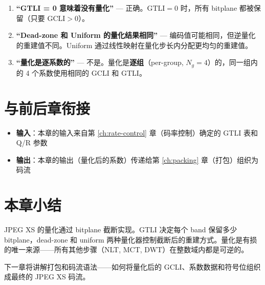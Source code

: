 \begin{misunderstanding}
\begin{enumerate}
  \item \textbf{``GTLI = 0 意味着没有量化''} --- 正确。$\mathrm{GTLI} = 0$ 时，所有 bitplane 都被保留（只要 $\mathrm{GCLI} > 0$）。
  \item \textbf{``Dead-zone 和 Uniform 的量化结果相同''} --- 编码值可能相同，但逆量化的重建值不同。Uniform 通过线性映射在量化步长内分配更均匀的重建值。
  \item \textbf{``量化是逐系数的''} --- 不是。量化是\textbf{逐组}（per-group, $N_g = 4$）的，同一组内的 4 个系数使用相同的 GCLI 和 GTLI。
\end{enumerate}
\end{misunderstanding}

\section{与前后章衔接}

\begin{itemize}
  \item \textbf{输入}：本章的输入来自第 \ref{ch:rate-control} 章（码率控制）确定的 GTLI 表和 Q/R 参数
  \item \textbf{输出}：本章的输出（量化后的系数）传递给第 \ref{ch:packing} 章（打包）组织为码流
\end{itemize}

\section{本章小结}

JPEG XS 的量化通过 bitplane 截断实现。GTLI 决定每个 band 保留多少 bitplane，dead-zone 和 uniform 两种量化器控制截断后的重建方式。量化是有损的唯一来源——所有其他步骤（NLT, MCT, DWT）在整数域内都是可逆的。

下一章将讲解打包和码流语法——如何将量化后的 GCLI、系数数据和符号位组织成最终的 JPEG XS 码流。
